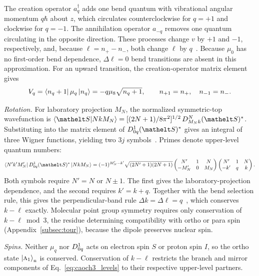 The creation operator $a_q^\dagger$ adds one bend quantum with vibrational angular momentum $q\hbar$ about $z$, which circulates counterclockwise for $q=+1$ and clockwise for $q=-1$. The annihilation operator $a_{-q}$ removes one quantum circulating in the opposite direction. These processes change $v$ by $+1$ and $-1$, respectively, and, because $\ell=n_+-n_-$, both change $\ell$ by $q$~\cite{Nielsen1951}. Because $\mu_0$ has no first-order bend dependence, $\Delta\ell=0$ bend transitions are absent in this approximation. For an upward transition, the creation-operator matrix element gives
\begin{equation}
V_q=\bra{n_q+1}\mu_q\ket{n_q}=-q\mu_8\sqrt{n_q+1},\qquad n_{+1}=n_+,\quad n_{-1}=n_-.
\label{eq:caoch3_bend_factor}
\end{equation}

\emph{Rotation.} For laboratory projection $M_N$, the normalized symmetric-top wavefunction is $\langle\orient|NkM_N\rangle=[(2N+1)/8\pi^2]^{1/2}\,\wignerD{N}_{M_Nk}(\orient)^*$. Substituting into the matrix element of $\wignerD{1}_{0q}(\orient)^*$ gives an integral of three Wigner functions, yielding two $3j$ symbols~\cite{Edmonds1957,Zare1988}. Primes denote upper-level quantum numbers:
\begin{equation}
\bra{N'k'M_N'}\wignerD{1}_{0q}(\orient)^*\ket{NkM_N}=(-1)^{M_N'-k'}\sqrt{(2N'+1)(2N+1)}\begin{pmatrix}N'&1&N\\-M_N'&0&M_N\end{pmatrix}\begin{pmatrix}N'&1&N\\-k'&q&k\end{pmatrix}.
\label{eq:caoch3_rotation_me}
\end{equation}
Both symbols require $N'=N$ or $N\pm1$. The first gives the laboratory-projection dependence, and the second requires $k'=k+q$. Together with the bend selection rule, this gives the perpendicular-band rule $\Delta k=\Delta\ell=q$~\cite{Herzberg1945}, which conserves $k-\ell$ exactly. Molecular point group symmetry requires only conservation of $k-\ell\bmod3$, the residue determining compatibility with ortho or para spin (Appendix~\ref{subsec:tour}), because the dipole preserves nuclear spin.

\emph{Spins.} Neither $\mu_q$ nor $D^{1}_{0q}$ acts on electron spin $S$ or proton spin $I$, so the ortho state $\ket{\text{\normalfont\scshape a}_{1}}_{\mathrm{n}}$ is conserved. Conservation of $k-\ell$ restricts the branch and mirror components of Eq.~\eqref{eq:caoch3_levels} to their respective upper-level partners.

